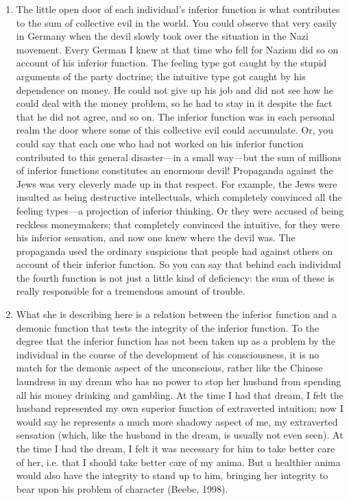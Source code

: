 \begin{enumerate}
    \item {} The little open door of each individual’s inferior function
        is what contributes to the sum of collective evil in the world. You
        could observe that very easily in Germany when the devil slowly took
        over the situation in the Nazi movement. Every German I knew at that
        time who fell for Nazism did so on account of his inferior function.
        The feeling type got caught by the stupid arguments of the party
        doctrine; the intuitive type got caught by his dependence on money. He
        could not give up his job and did not see how he could deal with the
        money problem, so he had to stay in it despite the fact that he did not
        agree, and so on. The inferior function was in each personal realm the
        door where some of this collective evil could accumulate. Or, you could
        say that each one who had not worked on his inferior function
        contributed to this general disaster—in a small way—but the sum of
        millions of inferior functions constitutes an enormous devil!
        Propaganda against the Jews was very cleverly made up in that respect.
        For example, the Jews were insulted as being destructive intellectuals,
        which completely convinced all the feeling types—a projection of
        inferior thinking. Or they were accused of being reckless moneymakers;
        that completely convinced the intuitive, for they were his inferior
        sensation, and now one knew where the devil was. The propaganda used
        the ordinary suspicions that people had against others on account of
        their inferior function. So you can say that behind each individual the
        fourth function is not just a little kind of deficiency: the sum of
        these is really responsible for a tremendous amount of trouble.

    \item {} What she is describing here is a
        relation between the inferior function and a demonic function that
        tests the integrity of the inferior function. To the degree that the
        inferior function has not been taken up as a problem by the individual
        in the course of the development of his consciousness, it is no match
        for the demonic aspect of the unconscious, rather like the Chinese
        laundress in my dream who has no power to stop her husband from
        spending all his money drinking and gambling. At the time I had that
        dream, I felt the husband represented my own superior function of
        extraverted intuition; now I would say he represents a much more
        shadowy aspect of me, my extraverted sensation (which, like the husband
        in the dream, is usually not even seen). At the time I had the dream, I
        felt it was necessary for him to take better care of her, i.e. that I
        should take better care of my anima. But a healthier anima would also
        have the integrity to stand up to him, bringing her integrity to bear
        upon his problem of character (Beebe, 1998).


\end{enumerate}
